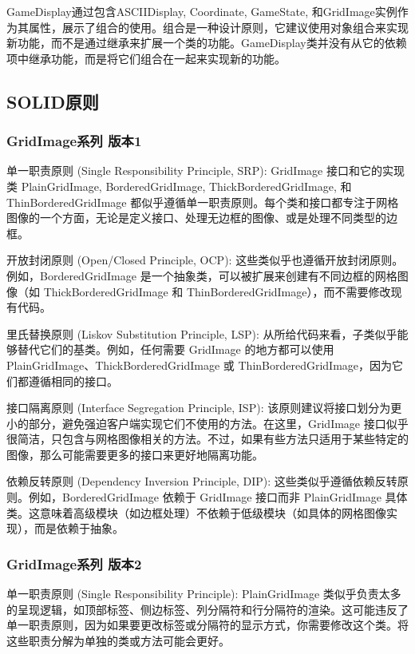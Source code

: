 GameDisplay通过包含ASCIIDisplay, Coordinate, GameState, 和GridImage实例作为其属性，展示了组合的使用。组合是一种设计原则，它建议使用对象组合来实现新功能，而不是通过继承来扩展一个类的功能。GameDisplay类并没有从它的依赖项中继承功能，而是将它们组合在一起来实现新的功能。

\subsection{SOLID原则}

\subsubsection{GridImage系列 版本1}

单一职责原则 (Single Responsibility Principle, SRP):
GridImage 接口和它的实现类 PlainGridImage, BorderedGridImage, ThickBorderedGridImage, 和 ThinBorderedGridImage 都似乎遵循单一职责原则。每个类和接口都专注于网格图像的一个方面，无论是定义接口、处理无边框的图像、或是处理不同类型的边框。

开放封闭原则 (Open/Closed Principle, OCP):
这些类似乎也遵循开放封闭原则。例如，BorderedGridImage 是一个抽象类，可以被扩展来创建有不同边框的网格图像（如 ThickBorderedGridImage 和 ThinBorderedGridImage），而不需要修改现有代码。

里氏替换原则 (Liskov Substitution Principle, LSP):
从所给代码来看，子类似乎能够替代它们的基类。例如，任何需要 GridImage 的地方都可以使用 PlainGridImage、ThickBorderedGridImage 或 ThinBorderedGridImage，因为它们都遵循相同的接口。

接口隔离原则 (Interface Segregation Principle, ISP):
该原则建议将接口划分为更小的部分，避免强迫客户端实现它们不使用的方法。在这里，GridImage 接口似乎很简洁，只包含与网格图像相关的方法。不过，如果有些方法只适用于某些特定的图像，那么可能需要更多的接口来更好地隔离功能。

依赖反转原则 (Dependency Inversion Principle, DIP):
这些类似乎遵循依赖反转原则。例如，BorderedGridImage 依赖于 GridImage 接口而非 PlainGridImage 具体类。这意味着高级模块（如边框处理）不依赖于低级模块（如具体的网格图像实现），而是依赖于抽象。

\subsubsection{GridImage系列 版本2}

单一职责原则 (Single Responsibility Principle):
PlainGridImage 类似乎负责太多的呈现逻辑，如顶部标签、侧边标签、列分隔符和行分隔符的渲染。这可能违反了单一职责原则，因为如果要更改标签或分隔符的显示方式，你需要修改这个类。将这些职责分解为单独的类或方法可能会更好。

